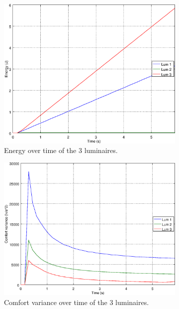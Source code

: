 \begin{figure}[ht]
    \centering
    \begin{subfigure}[t]{0.32\textwidth}
    \centering
    \includegraphics[width=.95\textwidth]{img/e_open_o101}
    \caption{Energy over time of the 3 luminaires.}
    \label{fig:e_open_o101}
    \end{subfigure}
    \begin{subfigure}[t]{0.32\textwidth}
    \centering
    \includegraphics[width=.95\textwidth]{img/f_open_o101}
    \caption{Comfort variance over time of the 3 luminaires.}
    \label{fig:f_open_o101}
    \end{subfigure}
    \begin{subfigure}[t]{0.32\textwidth}

\end{subfigure}
\end{figure}

